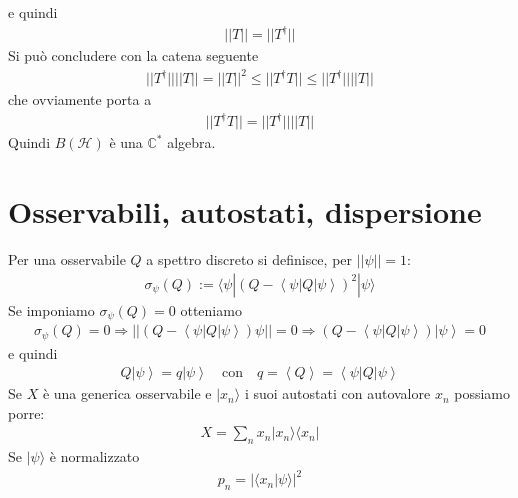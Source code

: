 e quindi
\begin{equation*}\begin{split}
||T||=||T^\dag||
\end{split}\end{equation*}
Si può concludere con la catena seguente
\begin{equation*}\begin{split}
||T^\dag||||T||= ||T||^2 \le||T^\dag T||\le||T^\dag||||T||
\end{split}\end{equation*}
che ovviamente porta a
\begin{equation*}\begin{split}
||T^\dag T||=||T^\dag||||T||
\end{split}\end{equation*}
Quindi $B(\mathcal{H})$ è una $\mathbb{C}^*$ algebra.

\section{Osservabili, autostati, dispersione}
Per una osservabile $Q$ a spettro discreto si definisce, per $||\psi||=1$:
\begin{equation*}\begin{split}
\sigma_\psi \left(Q\right):=\langle \psi|\left(Q-\left\langle \psi |Q|\psi  \right\rangle\right)^2  |\psi \rangle
\end{split}\end{equation*}
Se imponiamo $ \sigma_\psi \left(Q\right)=0$ otteniamo
\begin{equation*}\begin{split}
\sigma_\psi \left(Q\right)=0
\Longrightarrow ||\left(Q-\left\langle \psi |Q|\psi  \right\rangle\right)\psi ||=0
\Longrightarrow \left(Q-\left\langle \psi |Q|\psi  \right\rangle\right)\left |\psi  \right\rangle=0
\end{split}\end{equation*}
e quindi
\begin{equation*}\begin{split}
Q\left |\psi  \right\rangle=q\left |\psi  \right\rangle \quad \textrm{con} \quad q=\left\langle Q \right\rangle=\left\langle \psi |Q|\psi  \right\rangle
\end{split}\end{equation*}
Se $X$ è una generica osservabile e $|x_n\rangle$ i suoi autostati con autovalore $x_n$ possiamo porre:
\begin{equation*}\begin{split}
X=\sum_n{x_n|x_n\rangle\langle x_n|}
\end{split}\end{equation*}
Se $|\psi\rangle$ è normalizzato
\begin{equation*}\begin{split}
p_n=|\langle x_n | \psi \rangle |^2
\end{split}\end{equation*}

